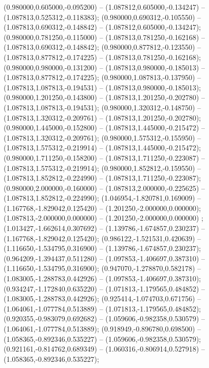  (0.980000,0.605000,-0.095200) -- (1.087812,0.605000,-0.134247) -- (1.087813,0.525312,-0.118383);
 (0.980000,0.690312,-0.105550) -- (1.087813,0.690312,-0.148842) -- (1.087812,0.605000,-0.134247);
 (0.980000,0.781250,-0.115000) -- (1.087813,0.781250,-0.162168) -- (1.087813,0.690312,-0.148842);
 (0.980000,0.877812,-0.123550) -- (1.087813,0.877812,-0.174225) -- (1.087813,0.781250,-0.162168);
 (0.980000,0.980000,-0.131200) -- (1.087813,0.980000,-0.185013) -- (1.087813,0.877812,-0.174225);
 (0.980000,1.087813,-0.137950) -- (1.087813,1.087813,-0.194531) -- (1.087813,0.980000,-0.185013);
 (0.980000,1.201250,-0.143800) -- (1.087813,1.201250,-0.202780) -- (1.087813,1.087813,-0.194531);
 (0.980000,1.320312,-0.148750) -- (1.087813,1.320312,-0.209761) -- (1.087813,1.201250,-0.202780);
 (0.980000,1.445000,-0.152800) -- (1.087813,1.445000,-0.215472) -- (1.087813,1.320312,-0.209761);
 (0.980000,1.575312,-0.155950) -- (1.087813,1.575312,-0.219914) -- (1.087813,1.445000,-0.215472);
 (0.980000,1.711250,-0.158200) -- (1.087813,1.711250,-0.223087) -- (1.087813,1.575312,-0.219914);
 (0.980000,1.852812,-0.159550) -- (1.087813,1.852812,-0.224990) -- (1.087813,1.711250,-0.223087);
 (0.980000,2.000000,-0.160000) -- (1.087813,2.000000,-0.225625) -- (1.087813,1.852812,-0.224990);
 (1.046954,-1.820781,0.169009) -- (1.167768,-1.829042,0.125420) -- (1.201250,-2.000000,0.000000);
 (1.087813,-2.000000,0.000000) -- (1.201250,-2.000000,0.000000) ;
 (1.013427,-1.662614,0.307692) -- (1.139786,-1.674857,0.230237) -- (1.167768,-1.829042,0.125420);
 (0.986122,-1.521531,0.420639) -- (1.116650,-1.534795,0.316900) -- (1.139786,-1.674857,0.230237);
 (0.964209,-1.394437,0.511280) -- (1.097853,-1.406697,0.387310) -- (1.116650,-1.534795,0.316900);
 (0.947070,-1.278870,0.582178) -- (1.083005,-1.288783,0.442926) -- (1.097853,-1.406697,0.387310);
 (0.934247,-1.172840,0.635220) -- (1.071813,-1.179565,0.484852) -- (1.083005,-1.288783,0.442926);
 (0.925414,-1.074703,0.671756) -- (1.064061,-1.077784,0.513889) -- (1.071813,-1.179565,0.484852);
 (0.920355,-0.983079,0.692682) -- (1.059606,-0.982358,0.530579) -- (1.064061,-1.077784,0.513889);
 (0.918949,-0.896780,0.698500) -- (1.058365,-0.892346,0.535227) -- (1.059606,-0.982358,0.530579);
 (0.921161,-0.814762,0.689349) -- (1.060316,-0.806914,0.527918) -- (1.058365,-0.892346,0.535227);

